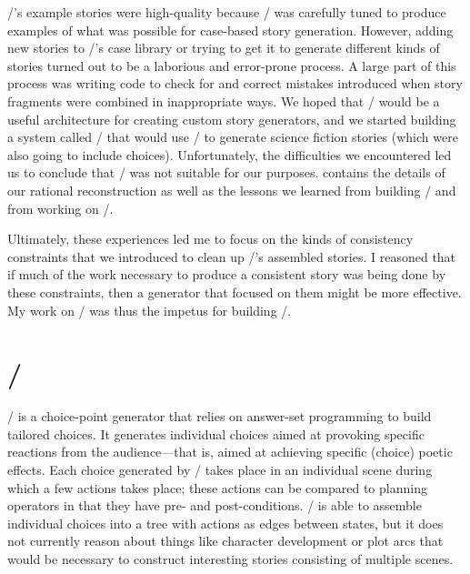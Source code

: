 \minstrel/'s example stories were high-quality because \minstrel/ was carefully tuned to produce examples of what was possible for case-based story generation.
%
However, adding new stories to \minstrel/'s case library or trying to get it to generate different kinds of stories turned out to be a laborious and error-prone process.
%
A large part of this process was writing code to check for and correct mistakes introduced when story fragments were combined in inappropriate ways.
%
We hoped that \skald/ would be a useful architecture for creating custom story generators, and we started building a system called \problemplanets/ that would use \skald/ to generate science fiction stories (which were also going to include choices).
%
Unfortunately, the difficulties we encountered led us to conclude that \skald/ was not suitable for our purposes.
%
 contains the details of our rational reconstruction as well as the lessons we learned from building \skald/ and from working on \problemplanets/.


Ultimately, these experiences led me to focus on the kinds of consistency constraints that we introduced to clean up \skald/'s assembled stories.
%
I reasoned that if much of the work necessary to produce a consistent story was being done by these constraints, then a generator that focused on them might be more effective. 
%
My work on \skald/ was thus the impetus for building \dunyazad/.



\section{\dunyazad/}

\dunyazad/ is a choice-point generator that relies on answer-set programming to build tailored choices.
%
It generates individual choices aimed at provoking specific reactions from the audience---that is, aimed at achieving specific (choice) poetic effects.
%
Each choice generated by \dunyazad/ takes place in an individual scene during which a few actions takes place; these actions can be compared to planning operators in that they have pre- and post-conditions.
%
\dunyazad/ is able to assemble individual choices into a tree with actions as edges between states, but it does not currently reason about things like character development or plot arcs that would be necessary to construct interesting stories consisting of multiple scenes.


